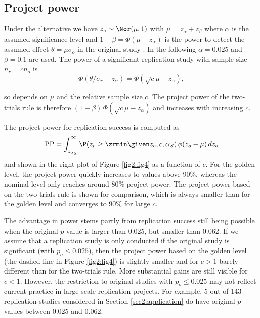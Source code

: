 \subsection{Project power}\label{sec2:PP}
Under the alternative we have $z_o\sim \Nor(\mu, 1)$ with
$\mu = z_\alpha + z_\beta$ where $\alpha$ is the assumed significance level and
$1-\beta = \Phi(\mu - z_\alpha)$ is the power to detect the assumed effect
$\theta = \mu \sigma_o$ in the original study \citep[Section 3.3]{Matthews2006}.
In the following $\alpha=0.025$ and $\beta=0.1$ are used. The power of a
significant replication study with sample size $n_r = c n_o$ is
\begin{equation*}
\Phi(\theta/\sigma_r - z_\alpha) =
\Phi(\sqrt{c} \mu - z_\alpha),
\end{equation*}

so depends on $\mu$ and the relative sample size $c$. The project power of the
two-trials rule is therefore $(1-\beta) \, \Phi(\sqrt{c} \mu - z_\alpha)$ and
increases with increasing $c$.


The project power for replication success is computed as
\begin{equation*}
  \mbox{PP} = \int_{z_{\alpha_S}}^{\infty}
\P(z_r \geq \zrmin \given z_o, c, \alpha_S) \,
  \phi(z_o - \mu) \, dz_o
\end{equation*}
and shown in the right plot of Figure \ref{fig2:fig4} as a function of $c$. For
the golden level, the project power quickly increases to values above 90\%,
whereas the nominal level only reaches around 80\% project power. The project
power based on the two-trials rule is shown for comparison, which is always
smaller than for the golden level and converges to 90\% for large $c$.

The advantage in power stems partly from replication success still being
possible when the original $p$-value is larger than 0.025, but smaller than
0.062. If we assume that a replication study is only conducted if the original
study is significant (with $p_o \leq 0.025$), then the project power based on
the golden level (the dashed line in Figure \ref{fig2:fig4}) is slightly smaller
and for $c>1$ barely different than for the two-trials rule. More substantial
gains are still visible for $c < 1$. However, the restriction to original
studies with $p_o \leq 0.025$ may not reflect current practice in large-scale
replication projects. For example, 5 out of 143 replication studies considered
in Section \ref{sec2:application} do have original $p$-values between 0.025 and
0.062.


